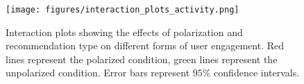 \begin{figure}[h!]
    \centering
    \texttt{[image: figures/interaction\_plots\_activity.png]}
    \caption{Interaction plots showing the effects of polarization and recommendation type on different forms of user engagement. Red lines represent the polarized condition, green lines represent the unpolarized condition. Error bars represent $95\%$ confidence intervals.}
    \label{fig:interaction-plot-recommendation-bias}
\end{figure}
